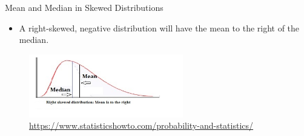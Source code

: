 \documentclass[10pt,dvipsnames, aspectratio=169]{beamer}
\begin{document}
\begin{frame}[t]{Mean and Median in Skewed Distributions}
	\begin{itemize}
		\item A right-skewed, negative distribution will have the mean to the 
		right of the median.
	\end{itemize}
	\begin{figure} [ht]
		\centering
		\includegraphics[width=0.6\textwidth]{eda/right-skewed.jpg}
		\caption{\url{https://www.statisticshowto.com/probability-and-statistics/}}
	\end{figure}
\end{frame}
\end{document}
